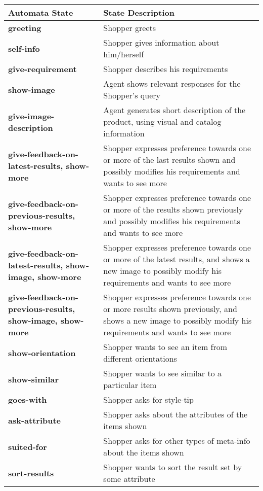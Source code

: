 \documentclass[10pt,a4paper]{article}
\begin{document}
\begin{table}[t]
{\normalsize
\begin{center}
\begin{tabular}{|p{5.8cm}|p{15.2cm}|}
\hline
\textbf{Automata State} & \textbf{State Description}\\ \hline
\textbf{greeting} & Shopper greets \\ \hline
\textbf{self-info} & Shopper gives information about him/herself \\ \hline
\textbf{give-requirement} & Shopper describes his requirements\\ \hline
\textbf{show-image} & Agent shows relevant responses for the Shopper's query\\  
\textbf{give-image-description} & Agent generates short description of the product, using visual and catalog information\\
\textbf{give-feedback-on-latest-results, show-more} & Shopper expresses preference towards one or more of the last results shown and possibly modifies his requirements and wants to see more \\ \hline
\textbf{give-feedback-on-previous-results, show-more} & Shopper expresses preference towards one or more of the results shown previously and possibly modifies his requirements and wants to see more \\ \hline
\textbf{give-feedback-on-latest-results, show-image, show-more} & Shopper expresses preference towards one or more of the latest results, and shows a new image to possibly modify his requirements and wants to see more \\ \hline
\textbf{give-feedback-on-previous-results, show-image, show-more} & Shopper expresses preference towards one or more results shown previously, and shows a new image to possibly modify his requirements and wants to see more \\ \hline
\textbf{show-orientation} & Shopper wants to see an item from different orientations\\ \hline
\textbf{show-similar} & Shopper wants to see similar to a particular item\\ \hline
\textbf{goes-with} & Shopper asks for style-tip\\ \hline
\textbf{ask-attribute} & Shopper asks about the attributes of the items shown\\ \hline
\textbf{suited-for} & Shopper asks for other types of meta-info about the items shown\\ \hline
\textbf{sort-results} & Shopper wants to sort the result set by some attribute\\ \hline

\end{tabular}
\end{center}}
\end{table}
\end{document}

